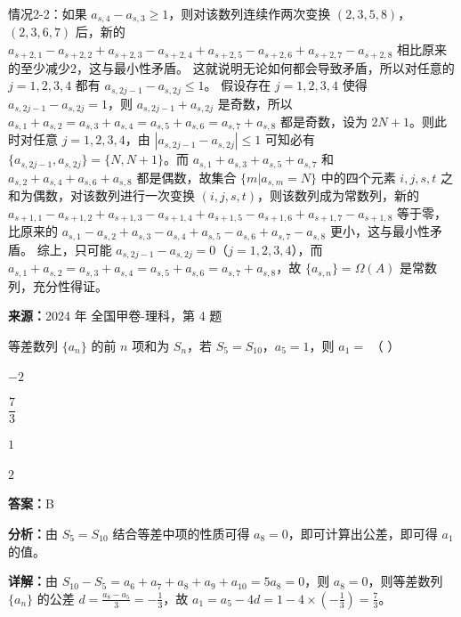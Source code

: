 \begin{question}[points=14]
\begin{solution}
情况2-2：如果 $a_{s,4}-a_{s,3}\geq 1$，则对该数列连续作两次变换 $(2,3,5,8)$，$(2,3,6,7)$ 后，新的 $a_{s+2,1}-a_{s+2,2}+a_{s+2,3}-a_{s+2,4}+a_{s+2,5}-a_{s+2,6}+a_{s+2,7}-a_{s+2,8}$ 相比原来的至少减少2，这与最小性矛盾。
这就说明无论如何都会导致矛盾，所以对任意的 $j=1,2,3,4$ 都有 $a_{s,2j-1}-a_{s,2j}\leq 1$。
假设存在 $j=1,2,3,4$ 使得 $a_{s,2j-1}-a_{s,2j}=1$，则 $a_{s,2j-1}+a_{s,2j}$ 是奇数，所以 $a_{s,1}+a_{s,2}=a_{s,3}+a_{s,4}=a_{s,5}+a_{s,6}=a_{s,7}+a_{s,8}$ 都是奇数，设为 $2N+1$。则此时对任意 $j=1,2,3,4$，由 $|a_{s,2j-1}-a_{s,2j}|\leq 1$ 可知必有 $\{a_{s,2j-1},a_{s,2j}\}=\{N,N+1\}$。而 $a_{s,1}+a_{s,3}+a_{s,5}+a_{s,7}$ 和 $a_{s,2}+a_{s,4}+a_{s,6}+a_{s,8}$ 都是偶数，故集合 $\{m|a_{s,m}=N\}$ 中的四个元素 $i,j,s,t$ 之和为偶数，对该数列进行一次变换 $(i,j,s,t)$，则该数列成为常数列，新的 $a_{s+1,1}-a_{s+1,2}+a_{s+1,3}-a_{s+1,4}+a_{s+1,5}-a_{s+1,6}+a_{s+1,7}-a_{s+1,8}$ 等于零，比原来的 $a_{s,1}-a_{s,2}+a_{s,3}-a_{s,4}+a_{s,5}-a_{s,6}+a_{s,7}-a_{s,8}$ 更小，这与最小性矛盾。
综上，只可能 $a_{s,2j-1}-a_{s,2j}=0$（$j=1,2,3,4$），而 $a_{s,1}+a_{s,2}=a_{s,3}+a_{s,4}=a_{s,5}+a_{s,6}=a_{s,7}+a_{s,8}$，故 $\{a_{s,n}\}=\Omega(A)$ 是常数列，充分性得证。
\end{solution}
\end{question}

\begin{question}[points=5]
\textbf{来源：}2024 年 全国甲卷-理科，第 4 题\par
等差数列 $\{a_n\}$ 的前 $n$ 项和为 $S_n$，若 $S_5=S_{10}$，$a_5=1$，则 $a_1=$ （   ）
\begin{choices}
  \item $-2$
  \item $\dfrac{7}{3}$
  \item $1$
  \item $2$
\end{choices}
\begin{solution}
\textbf{答案：}B

\textbf{分析：}由 $S_5=S_{10}$ 结合等差中项的性质可得 $a_8=0$，即可计算出公差，即可得 $a_1$ 的值。

\textbf{详解：}由 $S_{10}-S_5=a_6+a_7+a_8+a_9+a_{10}=5a_8=0$，则 $a_8=0$，则等差数列 $\{a_n\}$ 的公差 $d=\frac{a_8-a_5}{3}=-\frac{1}{3}$，故 $a_1=a_5-4d=1-4\times\left(-\frac{1}{3}\right)=\frac{7}{3}$。
\end{solution}
\end{question}

